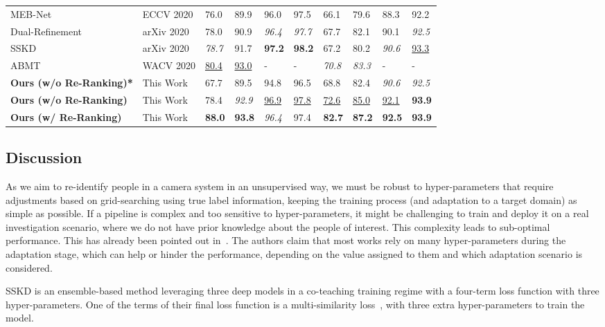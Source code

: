 \documentclass[journal]{IEEEtran}
\begin{document}
\begin{table*}[!ht]
\begin{tabular}{|p{2.7cm}| p{2.0cm}|p{0.8cm}|p{1.0cm}|p{1.0cm}|p{1.0cm}|p{0.8cm}|p{1.0cm}|p{1.0cm}|p{1.0cm}|}
MEB-Net \cite{zhai2020multiple} & ECCV 2020 & 76.0 & 89.9 & 96.0 & 97.5 & 66.1 & 79.6 & 88.3 & 92.2 \\
Dual-Refinement \cite{dai2020dual} & arXiv 2020 & 78.0 & 90.9 & \textit{96.4} & \textit{97.7} & 67.7 & 82.1 & 90.1 & \textit{92.5} \\
SSKD \cite{yin2020sskd} & arXiv 2020 & \textit{78.7} & 91.7 & \textbf{97.2} & \textbf{98.2} & 67.2 & 80.2 & \textit{90.6} & \underline{93.3} \\ 
ABMT \cite{chen2020enhancing} & WACV 2020 & \underline{80.4} & \underline{93.0} & - & - & \textit{70.8} & \textit{83.3} & - & - \\
\hline
\textbf{Ours (w/o Re-Ranking)*} & This Work & 67.7 & 89.5  & 94.8 & 96.5 & 68.8 & 82.4 & \textit{90.6} & \textit{92.5} \\ \hline
\textbf{Ours (w/o Re-Ranking)} & This Work & 78.4 & \textit{92.9} & \underline{96.9} & \underline{97.8} & \underline{72.6} & \underline{85.0} & \underline{92.1} & \textbf{93.9} \\ \hline
\textbf{Ours (w/ Re-Ranking)} & This Work & \textbf{88.0} & \textbf{93.8} & \textit{96.4} & 97.4 & \textbf{82.7} & \textbf{87.2} & \textbf{92.5} & \textbf{93.9} \\ \hline
\end{tabular}
\end{table*}

\subsection{Discussion}
\label{sec:discussion}

As we aim to re-identify people in a camera system in an unsupervised way, we must be robust to hyper-parameters that require adjustments based on grid-searching using true label information, keeping the training process (and adaptation to a target domain) as simple as possible. If a pipeline is complex and too sensitive to hyper-parameters, it might be challenging to train and deploy it on a real investigation scenario, where we do not have prior knowledge about the people of interest. This complexity leads to sub-optimal performance. 
This has already been pointed out in~\cite{dubourvieux2020unsupervised}. The authors claim that most works rely on many hyper-parameters during the adaptation stage, which can help or hinder the performance, depending on the value assigned to them and which adaptation scenario is considered.

SSKD\cite{yin2020sskd} is an ensemble-based method leveraging three deep models in a co-teaching training regime with a four-term loss function with three hyper-parameters. One of the terms of their final loss function is a multi-similarity loss~\cite{wang2019multi}, with three extra hyper-parameters to train the model.  
\end{document}

